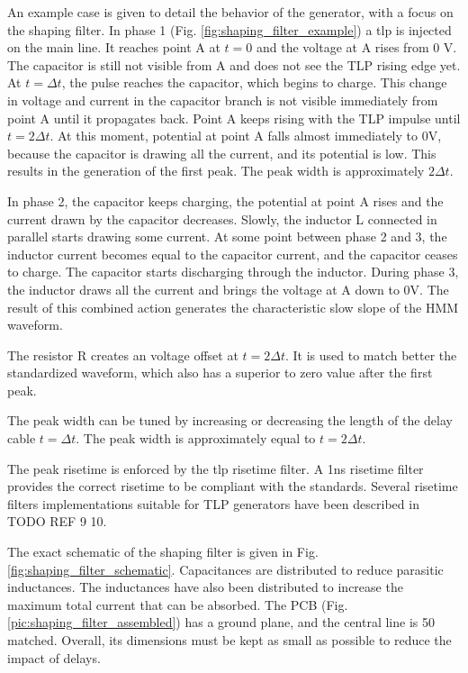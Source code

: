 An example case is given to detail the behavior of the generator, with a focus on the shaping filter.
In phase 1 (Fig. \ref{fig:shaping_filter_example}) a \gls{tlp} is injected on the main line.
It reaches point A at $t=0$ and the voltage at A rises from 0 V.
The capacitor is still not visible from A and does not see the TLP rising edge yet.
At $t=\Delta t$, the pulse reaches the capacitor, which begins to charge.
This change in voltage and current in the capacitor branch is not visible immediately from point A until it propagates back.
Point A keeps rising with the TLP impulse until $t=2\Delta t$.
At this moment, potential at point A falls almost immediately to 0V, because the capacitor is drawing all the current, and its potential is low.
This results in the generation of the first peak.
The peak width is approximately $2\Delta t$.

In phase 2, the capacitor keeps charging, the potential at point A rises and the current drawn by the capacitor decreases.
Slowly, the inductor L connected in parallel starts drawing some current.
At some point between phase 2 and 3, the inductor current becomes equal to the capacitor current, and the capacitor ceases to charge.
The capacitor starts discharging through the inductor.
During phase 3, the inductor draws all the current and brings the voltage at A down to 0V.
The result of this combined action generates the characteristic slow slope of the HMM waveform.

The resistor R creates an voltage offset at $t=2\Delta t$.
It is used to match better the standardized waveform, which also has a superior to zero value after the first peak.

The peak width can be tuned by increasing or decreasing the length of the delay cable $t=\Delta t$.
The peak width is approximately equal to $t=2\Delta t$.

The peak risetime is enforced by the \gls{tlp} risetime filter.
A 1ns risetime filter provides the correct risetime to be compliant with the standards.
Several risetime filters implementations suitable for TLP generators have been described in TODO REF 9 10.

The exact schematic of the shaping filter is given in Fig. \ref{fig:shaping_filter_schematic}.
Capacitances are distributed to reduce parasitic inductances.
The inductances have also been distributed to increase the maximum total current that can be absorbed.
The PCB (Fig. \ref{pic:shaping_filter_assembled}) has a ground plane, and the central line is 50\textOmega{} matched.
Overall, its dimensions must be kept as small as possible to reduce the impact of delays.

